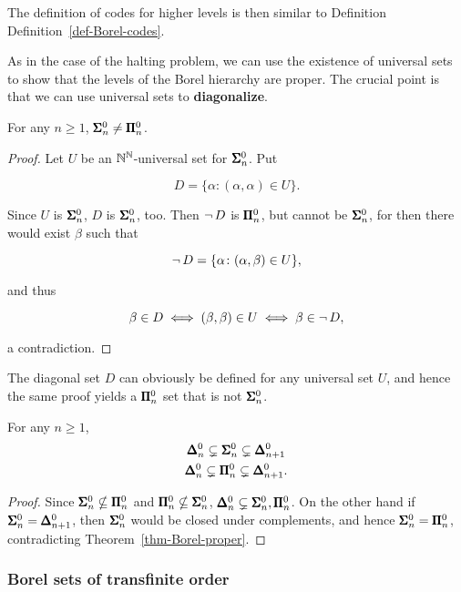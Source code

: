 The definition of codes for higher levels is then similar to Definition Definition~\ref{def-Borel-codes}.

As in the case of the halting problem, we can use the existence of universal sets to show that the levels of the Borel hierarchy are proper. The crucial point is that we can use universal sets to \textbf{diagonalize}.

\begin{theorem}\label{thm-borel-proper}For any $n \geq 1$, $\pmb{\Sigma}^0_n \neq \pmb{\Pi}^0_n$.

\end{theorem}\begin{proof}Let $U$ be an $\mathbb{N}^{\mathbb{N}}$-universal set for $\pmb{\Sigma}^0_n$. Put

\begin{equation}
D = \{ \alpha \colon (\alpha, \alpha) \in U \}.
\end{equation}

Since $U$ is $\pmb{\Sigma}^0_n$, $D$ is $\pmb{\Sigma}^0_n$, too. Then $\neg \, D$ is $\pmb{\Pi}^0_n$, but cannot be $\pmb{\Sigma}^0_n$, for then there would exist $\beta$ such that

\begin{equation}
\neg \, D = \{ \alpha \colon (\alpha, \beta) \in U \},
\end{equation}

and thus

\begin{equation}
\beta \in D \iff (\beta, \beta) \in U \iff \beta \in \neg \, D,
\end{equation}

a contradiction.

\end{proof}The diagonal set $D$ can obviously be defined for any universal set $U$, and hence the same proof yields a $\pmb{\Pi}^0_n$ set that is not $\pmb{\Sigma}^0_n$.

\begin{corollary}\label{cor-hier-proper}For any $n \geq 1$,
\begin{gather*}
    \pmb{\Delta}^0_n \subsetneq \pmb{\Sigma}^0_n \subsetneq \pmb{\Delta}^0_{n+1} \\
    \pmb{\Delta}^0_n \subsetneq \pmb{\Pi}^0_n \subsetneq \pmb{\Delta}^0_{n+1}.
\end{gather*}
\end{corollary}\begin{proof}Since $\pmb{\Sigma}^0_{n} \nsubseteq \pmb{\Pi}^0_{n}$ and $\pmb{\Pi}^0_{n} \nsubseteq \pmb{\Sigma}^0_{n}$, $\pmb{\Delta}^0_n \subsetneq \pmb{\Sigma}^0_{n},\pmb{\Pi}^0_{n}$. On the other hand if $\pmb{\Sigma}^0_{n} = \pmb{\Delta}^0_{n+1}$, then $\pmb{\Sigma}^0_{n}$ would be closed under complements, and hence $\pmb{\Sigma}^0_{n} = \pmb{\Pi}^0_{n}$, contradicting Theorem~\ref{thm-Borel-proper}.

\end{proof}\subsubsection{Borel sets of transfinite order}

